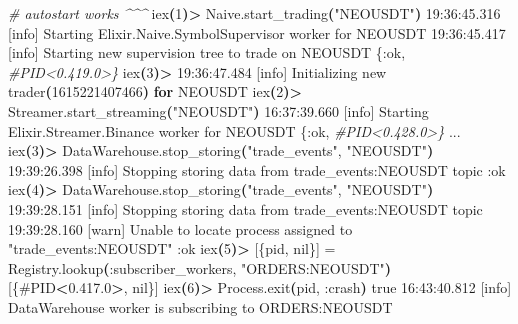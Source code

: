 \documentclass[
]{book}
\newenvironment{Shaded}{\begin{snugshade}}{\end{snugshade}}
\newcommand{\CommentTok}[1]{\textcolor[rgb]{0.56,0.35,0.01}{\textit{#1}}}
\newcommand{\ControlFlowTok}[1]{\textcolor[rgb]{0.13,0.29,0.53}{\textbf{#1}}}
\newcommand{\ErrorTok}[1]{\textcolor[rgb]{0.64,0.00,0.00}{\textbf{#1}}}
\newcommand{\ExtensionTok}[1]{#1}
\newcommand{\FunctionTok}[1]{\textcolor[rgb]{0.00,0.00,0.00}{#1}}
\newcommand{\KeywordTok}[1]{\textcolor[rgb]{0.13,0.29,0.53}{\textbf{#1}}}
\newcommand{\NormalTok}[1]{#1}
\newcommand{\OperatorTok}[1]{\textcolor[rgb]{0.81,0.36,0.00}{\textbf{#1}}}
\newcommand{\StringTok}[1]{\textcolor[rgb]{0.31,0.60,0.02}{#1}}
\begin{document}
\begin{Shaded}
\begin{Highlighting}[]
\CommentTok{\# autostart works \^{}\^{}\^{}}
\ExtensionTok{iex}\ErrorTok{(}\ExtensionTok{1}\KeywordTok{)}\OperatorTok{\textgreater{}}\NormalTok{ Naive.start\_trading}\KeywordTok{(}\StringTok{"NEOUSDT"}\KeywordTok{)}
\ExtensionTok{19:36:45.316}\NormalTok{ [info]  Starting Elixir.Naive.SymbolSupervisor worker for NEOUSDT}
\ExtensionTok{19:36:45.417}\NormalTok{ [info]  Starting new supervision tree to trade on NEOUSDT}
\ExtensionTok{\{:ok,} \CommentTok{\#PID\textless{}0.419.0\textgreater{}\}}
\ExtensionTok{iex}\ErrorTok{(}\ExtensionTok{3}\KeywordTok{)}\OperatorTok{\textgreater{}} 
\ExtensionTok{19:36:47.484}\NormalTok{ [info]  Initializing new trader}\ErrorTok{(}\ExtensionTok{1615221407466}\KeywordTok{)} \ControlFlowTok{for}\NormalTok{ NEOUSDT}
\ExtensionTok{iex}\ErrorTok{(}\ExtensionTok{2}\KeywordTok{)}\OperatorTok{\textgreater{}}\NormalTok{ Streamer.start\_streaming}\KeywordTok{(}\StringTok{"NEOUSDT"}\KeywordTok{)}
\ExtensionTok{16:37:39.660}\NormalTok{ [info]  Starting Elixir.Streamer.Binance worker for NEOUSDT}
\ExtensionTok{\{:ok,} \CommentTok{\#PID\textless{}0.428.0\textgreater{}\}}
\ExtensionTok{...}
\ExtensionTok{iex}\ErrorTok{(}\ExtensionTok{3}\KeywordTok{)}\OperatorTok{\textgreater{}}\NormalTok{ DataWarehouse.stop\_storing}\KeywordTok{(}\StringTok{"trade\_events"}\ExtensionTok{,} \StringTok{"NEOUSDT"}\KeywordTok{)}
\ExtensionTok{19:39:26.398}\NormalTok{ [info]  Stopping storing data from trade\_events:NEOUSDT topic}
\ExtensionTok{:ok}
\ExtensionTok{iex}\ErrorTok{(}\ExtensionTok{4}\KeywordTok{)}\OperatorTok{\textgreater{}}\NormalTok{ DataWarehouse.stop\_storing}\KeywordTok{(}\StringTok{"trade\_events"}\ExtensionTok{,} \StringTok{"NEOUSDT"}\KeywordTok{)}
\ExtensionTok{19:39:28.151}\NormalTok{ [info]  Stopping storing data from trade\_events:NEOUSDT topic}
\ExtensionTok{19:39:28.160}\NormalTok{ [warn]  Unable to locate process assigned to }\StringTok{"trade\_events:NEOUSDT"}
\ExtensionTok{:ok}
\ExtensionTok{iex}\ErrorTok{(}\ExtensionTok{5}\KeywordTok{)}\OperatorTok{\textgreater{}}\NormalTok{ [\{pid, }\ExtensionTok{nil\}]}\NormalTok{ = Registry.lookup}\ErrorTok{(}\ExtensionTok{:subscriber\_workers,} \StringTok{"ORDERS:NEOUSDT"}\KeywordTok{)}
\ExtensionTok{[\{\#PID}\OperatorTok{\textless{}}\NormalTok{0.417.0}\OperatorTok{\textgreater{}}\NormalTok{, nil\}]}
\ExtensionTok{iex}\ErrorTok{(}\ExtensionTok{6}\KeywordTok{)}\OperatorTok{\textgreater{}}\NormalTok{ Process.exit}\KeywordTok{(}\ExtensionTok{pid,}\NormalTok{ :crash}\KeywordTok{)}
\FunctionTok{true}
\ExtensionTok{16:43:40.812}\NormalTok{ [info]  DataWarehouse worker is subscribing to ORDERS:NEOUSDT}
\end{Highlighting}
\end{Shaded}
\end{document}

